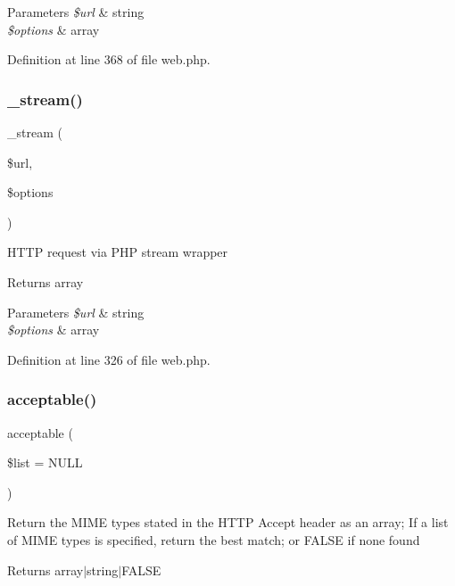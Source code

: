 \begin{DoxyParams}{Parameters}
{\em \$url} & string \\
\hline
{\em \$options} & array \\
\hline
\end{DoxyParams}


Definition at line 368 of file web.\+php.

\hypertarget{class_web_ae9817da907b04f9d8e4fe307ef5180b8}{}\label{class_web_ae9817da907b04f9d8e4fe307ef5180b8} 
\subsubsection{\texorpdfstring{\+\_\+stream()}{\_stream()}}
{\footnotesize\ttfamily \+\_\+stream (\begin{DoxyParamCaption}\item[{}]{\$url,  }\item[{}]{\$options }\end{DoxyParamCaption})\hspace{0.3cm}{\ttfamily [protected]}}

H\+T\+TP request via P\+HP stream wrapper \begin{DoxyReturn}{Returns}
array 
\end{DoxyReturn}

\begin{DoxyParams}{Parameters}
{\em \$url} & string \\
\hline
{\em \$options} & array \\
\hline
\end{DoxyParams}


Definition at line 326 of file web.\+php.

\hypertarget{class_web_a67e70e21f07d54392cae50a140364268}{}\label{class_web_a67e70e21f07d54392cae50a140364268} 
\subsubsection{\texorpdfstring{acceptable()}{acceptable()}}
{\footnotesize\ttfamily acceptable (\begin{DoxyParamCaption}\item[{}]{\$list = {\ttfamily NULL} }\end{DoxyParamCaption})}

Return the M\+I\+ME types stated in the H\+T\+TP Accept header as an array; If a list of M\+I\+ME types is specified, return the best match; or F\+A\+L\+SE if none found \begin{DoxyReturn}{Returns}
array$\vert$string$\vert$\+F\+A\+L\+SE 
\end{DoxyReturn}

